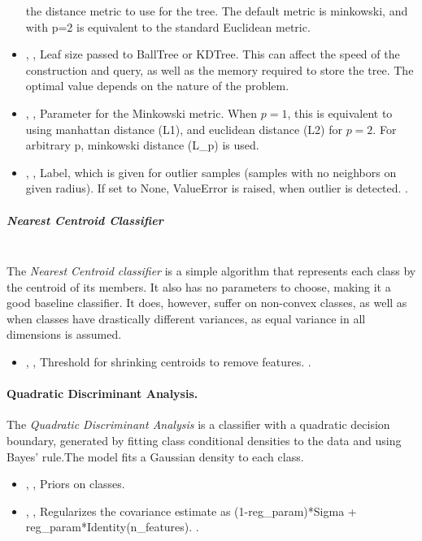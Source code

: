 \begin{itemize}
  the distance metric to use for the tree.
  The default metric is minkowski, and with p=2 is equivalent to the standard
  Euclidean metric.
  \item {}, ,
  Leaf size passed to BallTree or KDTree.
  This can affect the speed of the construction and query, as well as the memory
  required to store the tree.
  The optimal value depends on the nature of the problem.
  \item {}, ,
  Parameter for the Minkowski metric.
  When $p = 1$, this is equivalent to using manhattan distance (L1), and
  euclidean distance (L2) for $p = 2$.
  For arbitrary p, minkowski distance (L\_p) is used.
  \item {}, ,
  Label, which is given for outlier samples (samples with no neighbors on given
  radius).
  If set to None, ValueError is raised, when outlier is detected.
  .
\end{itemize}
\subparagraph{Nearest Centroid Classifier}
\mbox{}
\\The \textit{Nearest Centroid classifier} is a simple algorithm that represents
each class by the centroid of its members.
%
It also has no parameters to choose, making it a good baseline classifier.
%
It does, however, suffer on non-convex classes, as well as when classes have
drastically different variances, as equal variance in all dimensions is assumed.
%
\begin{itemize}
  \item {}, ,
  Threshold for shrinking centroids to remove features.
  .
\end{itemize}

\paragraph{Quadratic Discriminant Analysis.}
\label{QDA}
The \textit{Quadratic Discriminant Analysis} is a classifier with a quadratic
decision boundary, generated by fitting class conditional densities to the data
and using Bayes' rule.The model fits a Gaussian density to each class.
%
\begin{itemize}
  \item {}, ,
  Priors on classes.
  \item {}, ,
  Regularizes the covariance estimate as (1-reg\_param)*Sigma +
  reg\_param*Identity(n\_features).
  .
\end{itemize}

